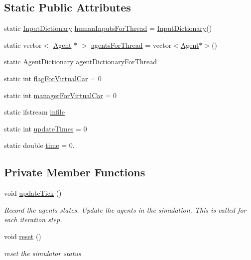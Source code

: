 \subsection*{Static Public Attributes}
\begin{DoxyCompactItemize}
\item 
static \hyperlink{Server_8hpp_a49cc8333bde52a7f1eb36bdb3e4e8a06}{Input\+Dictionary} \hyperlink{classSimulator_ae91cf2cc1bc4365ea0a6072e5d2accf5}{human\+Inputs\+For\+Thread} = \hyperlink{Server_8hpp_a49cc8333bde52a7f1eb36bdb3e4e8a06}{Input\+Dictionary}()
\item 
static vector$<$ \hyperlink{classAgent}{Agent} $\ast$ $>$ \hyperlink{classSimulator_ae7447b3c665ecc437eaea013d3163b67}{agents\+For\+Thread} = vector$<$\hyperlink{classAgent}{Agent}$\ast$$>$()
\item 
static \hyperlink{Server_8hpp_acc6d6e73aa06631da7c2f627f9979d64}{Agent\+Dictionary} \hyperlink{classSimulator_a5e3d11490c6c7fec578feee96166aa44}{agent\+Dictionary\+For\+Thread}
\item 
static int \hyperlink{classSimulator_ab9f7b36020e146f22b493267fc630f82}{flag\+For\+Virtual\+Car} = 0
\item 
static int \hyperlink{classSimulator_a288aba2bf9db7bf5e05a41cbd810e6de}{manager\+For\+Virtual\+Car} = 0
\item 
static ifstream \hyperlink{classSimulator_a41ca99de68be458860955dec68b04aad}{infile}
\item 
static int \hyperlink{classSimulator_a0173a212ad88cce09b31e4d65a0e94a8}{update\+Times} = 0
\item 
static double \hyperlink{classSimulator_aa066f39b0352ed03976adf41ff67c1ab}{time} = 0.
\end{DoxyCompactItemize}
\subsection*{Private Member Functions}
\begin{DoxyCompactItemize}
\item 
void \hyperlink{classSimulator_aa9bc9a3e38032f3b5e96c4466625bf5c}{update\+Tick} ()
\begin{DoxyCompactList}\small\item\em Record the agents states. Update the agents in the simulation. This is called for each iteration step. \end{DoxyCompactList}\item 
void \hyperlink{classSimulator_aad68e1807b14ca5bfd11cb7ebba25645}{reset} ()
\begin{DoxyCompactList}\small\item\em reset the simulator status \end{DoxyCompactList}\end{DoxyCompactItemize}
